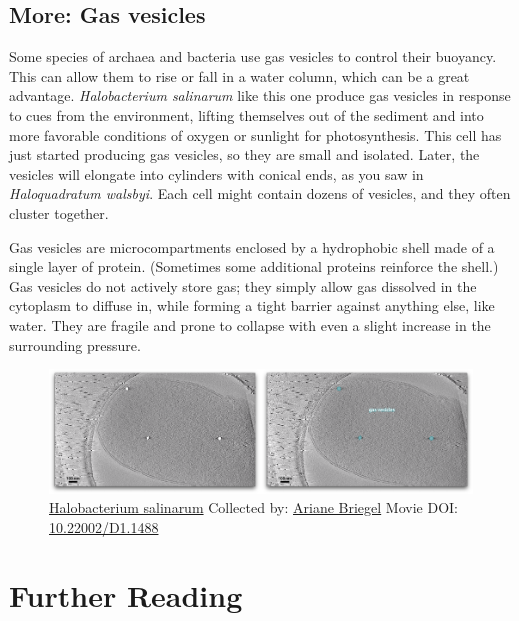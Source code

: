 \documentclass[]{tufte-book}
\begin{document}
\hypertarget{Gas_vesicles}{\subsection*{More: Gas
vesicles}\label{Gas_vesicles}}

Some species of archaea and bacteria use gas vesicles to control their
buoyancy. This can allow them to rise or fall in a water column, which
can be a great advantage. \emph{Halobacterium salinarum} like this one
produce gas vesicles in response to cues from the environment, lifting
themselves out of the sediment and into more favorable conditions of
oxygen or sunlight for photosynthesis. This cell has just started
producing gas vesicles, so they are small and isolated. Later, the
vesicles will elongate into cylinders with conical ends, as you saw in
\emph{Haloquadratum walsbyi}. Each cell might contain dozens of
vesicles, and they often cluster together.

Gas vesicles are microcompartments enclosed by a hydrophobic shell made
of a single layer of protein. (Sometimes some additional proteins
reinforce the shell.) Gas vesicles do not actively store gas; they
simply allow gas dissolved in the cytoplasm to diffuse in, while forming
a tight barrier against anything else, like water. They are fragile and
prone to collapse with even a slight increase in the surrounding
pressure.





\begin{figure}
\includegraphics{movie_stills/3_7a} \caption[\protect\hyperlink{tree}{Halobacterium salinarum} Collected
by: \protect\hyperlink{ariane_briegel}{Ariane Briegel} Movie DOI:
\href{https://doi.org/10.22002/D1.1488}{10.22002/D1.1488}]{\protect\hyperlink{tree}{Halobacterium salinarum} Collected
by: \protect\hyperlink{ariane_briegel}{Ariane Briegel} Movie DOI:
\href{https://doi.org/10.22002/D1.1488}{10.22002/D1.1488}}\label{fig:3-7a}
\end{figure}

\section{Further Reading}\label{further-reading}
\end{document}
